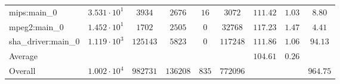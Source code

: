 \begin{tabular}{|l|c|c|c|c|c|c|c|c|}
mips:main\_0            & $ 3.531 \cdot 10^{1} $ & $ 3934   $ & $ 2676   $ & $ 16  $ & $ 3072   $ & $ 111.42      $ & $ 1.03    $ & $ 8.80    $ \\
mpeg2:main\_0           & $ 1.452 \cdot 10^{1} $ & $ 1702   $ & $ 2505   $ & $ 0   $ & $ 32768  $ & $ 117.23      $ & $ 1.47    $ & $ 4.41    $ \\
sha\_driver:main\_0     & $ 1.119 \cdot 10^{3} $ & $ 125143 $ & $ 5823   $ & $ 0   $ & $ 117248 $ & $ 111.86      $ & $ 1.06    $ & $ 94.13   $ \\
\hline
Average                 & $                    $ & $        $ & $        $ & $     $ & $        $ & $ 104.61      $ & $ 0.26    $ & $         $ \\
\hline
Overall                 & $ 1.002 \cdot 10^{4} $ & $ 982731 $ & $ 136208 $ & $ 835 $ & $ 772096 $ & $             $ & $         $ & $ 964.75  $ \\
\hline
\end{tabular}
